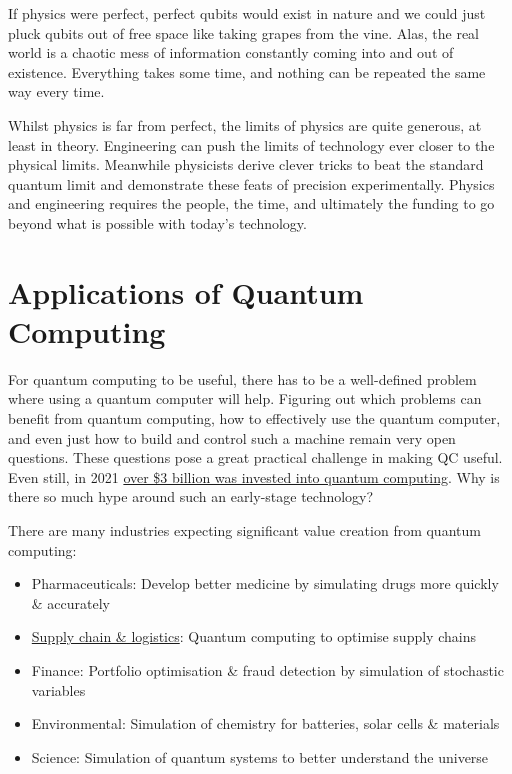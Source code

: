 If physics were perfect, perfect qubits would exist in nature and we could just pluck qubits out of free space like taking grapes from the vine. Alas, the real world is a chaotic mess of information constantly coming into and out of existence. Everything takes some time, and nothing can be repeated the same way every time. 

Whilst physics is far from perfect, the limits of physics are quite generous, at least in theory. Engineering can push the limits of technology ever closer to the physical limits. Meanwhile physicists derive clever tricks to beat the standard quantum limit and demonstrate these feats of precision experimentally. Physics and engineering requires the people, the time, and ultimately the funding to go beyond what is possible with today's technology. 

\section{Applications of Quantum Computing}


For quantum computing to be useful, there has to be a well-defined problem where using a quantum computer will help. Figuring out which problems can benefit from quantum computing, how to effectively use the quantum computer, and even just how to build and control such a machine remain very open questions. These questions pose a great practical challenge in making QC useful. Even still, in 2021 \href{https://www.mckinsey.com/business-functions/mckinsey-digital/our-insights/quantum-computing-funding-remains-strong-but-talent-gap-raises-concern}{over \$3 billion was invested into quantum computing}. Why is there so much hype around such an early-stage technology? 

There are many industries expecting significant value creation from quantum computing: 

\begin{itemize}
        
    \item Pharmaceuticals: Develop better medicine by simulating drugs more quickly \& accurately  
    \item \hyperlink{https://www.youtube.com/watch?v=jA7iopqDm94}{Supply chain \& logistics}: Quantum computing to optimise supply chains 
    \item Finance: Portfolio optimisation \& fraud detection by simulation of stochastic variables
    \item Environmental: Simulation of chemistry for batteries, solar cells \& materials
    \item Science: Simulation of quantum systems to better understand the universe
    
\end{itemize}

